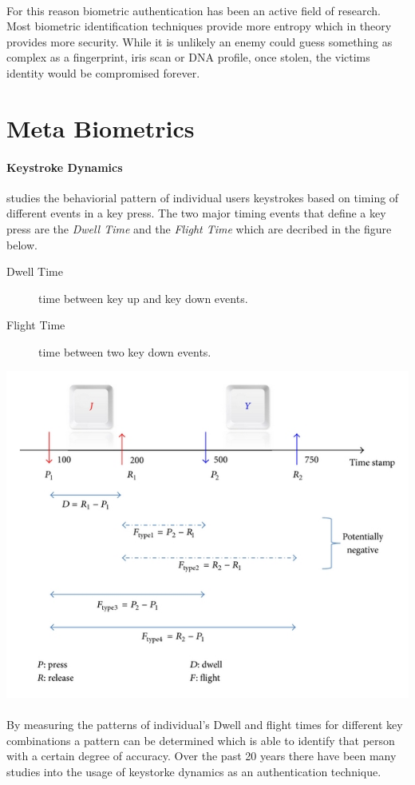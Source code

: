 \documentclass[fancychapters]{report}
\begin{document}
\paragraph{}For this reason biometric authentication has been an active field of research.\cite{BIOMATIC} Most biometric identification techniques provide more entropy which in theory provides more security.
While it is unlikely an enemy could guess something as complex as a fingerprint, iris scan or DNA profile, once stolen, the victims identity would be compromised forever. \cite{IDTHEFT1}
\section{Meta Biometrics}
\paragraph{Keystroke Dynamics} studies the behaviorial pattern of individual users keystrokes based on timing of different events in a key press. \cite{KEYSTROKE1}
The two major timing events that define a key press are the \textit{Dwell Time} and the \textit{Flight Time} which are decribed in the figure below.
\begin{description}
\item[Dwell Time] time between key up and key down events.
\item[Flight Time] time between two key down events. 
\end{description}
\begin{center}
	\includegraphics[width=.5\textwidth]{dwell_flight}
\end{center}
\paragraph{}By measuring the patterns of individual's Dwell and flight times for different key combinations a pattern can be determined which is able to identify that person with a certain degree of accuracy.
Over the past 20 years there have been many studies into the usage of keystorke dynamics as an authentication technique. \cite{KEYSTROKE2} \cite{KEYSTROKE3} \cite{KEYSTROKE4} \cite{KEYSTROKE5} \cite{KEYSTROKE6} 
\end{document}
